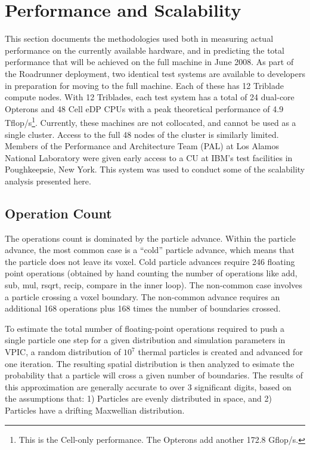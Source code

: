 \documentclass[10pt]{article}
\begin{document}
\section{Performance and Scalability} \label{sec:performance}

This section documents the methodologies used both in measuring actual
performance on the currently available hardware, and in predicting the
total performance that will be achieved on the full machine in June
2008.  As part of the Roadrunner deployment, two identical test
systems are available to developers in preparation for moving to the
full machine.  Each of these has 12 Triblade compute nodes.  With 12
Triblades, each test system has a total of 24 dual-core Opterons and
48 Cell eDP CPUs with a peak theoretical performance of 4.9
Tflop/s\footnote{This is the Cell-only performance.  The Opterons add
another 172.8 Gflop/s.}.  Currently, these machines are not
collocated, and cannot be used as a single cluster.  Access to the
full 48 nodes of the cluster is similarly limited.  Members of the
Performance and Architecture Team (PAL) at Los Alamos National
Laboratory were given early access to a CU at IBM's test facilities in
Poughkeepsie, New York.  This system was used to conduct some of the
scalability analysis presented here.

\subsection{Operation Count}

The operations count is dominated by the particle advance.  Within the
particle advance, the most common case is a ``cold'' particle advance,
which means that the particle does not leave its voxel.  Cold particle
advances require 246 floating point operations (obtained by hand
counting the number of operations like add, sub, mul, rsqrt, recip,
compare in the inner loop).  The non-common case involves a particle
crossing a voxel boundary.  The non-common advance requires an
additional 168 operations plus 168 times the number of boundaries
crossed.

To estimate the total number of floating-point operations required to
push a single particle one step for a given distribution and
simulation parameters in VPIC, a random distribution of $10^7$ thermal
particles is created and advanced for one iteration.  The resulting
spatial distribution is then analyzed to esimate the probability that
a particle will cross a given number of boundaries.  The results of
this approximation are generally accurate to over 3 significant
digits, based on the assumptions that: 1) Particles are evenly
distributed in space, and 2) Particles have a drifting Maxwellian
distribution.
\end{document}
